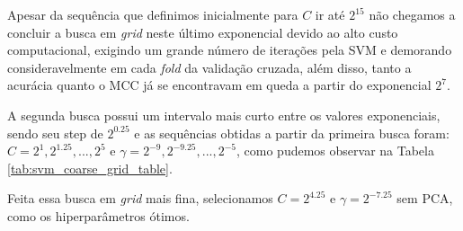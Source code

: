 Apesar da sequência que definimos inicialmente para $C$ ir até $2^{15}$ não chegamos a concluir a busca em \emph{grid} neste último exponencial devido ao alto custo computacional, exigindo um grande número de iterações pela SVM e demorando consideravelmente em cada \emph{fold} da validação cruzada, além disso, tanto a acurácia quanto o MCC já se encontravam em queda a partir do exponencial $2^7$.

A segunda busca possui um intervalo mais curto entre os valores exponenciais, sendo seu step de $2^{0.25}$ e as sequências obtidas a partir da primeira busca foram: $C = 2^{1}, 2^{1.25}, ..., 2^{5}$ e $\gamma = 2^{-9}, 2^{-9.25}, ..., 2^{-5}$, como pudemos observar na Tabela \ref{tab:svm_coarse_grid_table}.

Feita essa busca em \emph{grid} mais fina, selecionamos $C = 2^{4.25}$ e $\gamma = 2^{-7.25}$ sem PCA, como os hiperparâmetros ótimos.